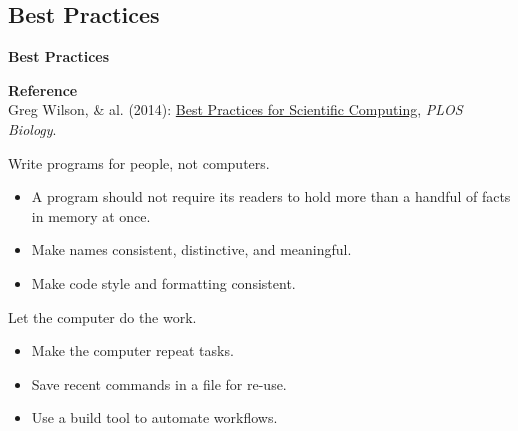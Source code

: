 
\begin{frame}\section{Best Practices}	
\begin{center}\textbf{\huge Best Practices}\end{center}
\end{frame}


\begin{frame}\begin{center}
	\textbf{Reference}\\\vspace{0.3cm}
    Greg Wilson, \& al. (2014): \href{http://www.plosbiology.org/article/info\%3Adoi\%2F10.1371\%2Fjournal.pbio.1001745}{Best Practices for Scientific Computing}, \textit{PLOS Biology}.\nocite{Wilson.2014}
    \end{center}
\end{frame}

\begin{frame}
\begin{cenumerate*}
\item Write programs for people, not computers.\vspace{0.3cm}
	\begin{itemize}
	\item A program should not require its readers to hold more than a handful of facts in memory at once.\vspace{0.2cm}
	\item Make names consistent, distinctive, and meaningful.\vspace{0.2cm}
	\item Make code style and formatting consistent.
	\end{itemize}
\end{cenumerate*}
\end{frame}


\begin{frame}
\begin{cenumerate}
\item Let the computer do the work. \vspace{0.3cm}
	\begin{itemize}
	\item Make the computer repeat tasks.\vspace{0.2cm}
	\item Save recent commands in a file for re-use.\vspace{0.2cm}
	\item Use a build tool to automate workflows.
	\end{itemize}
\end{cenumerate}
\end{frame}

